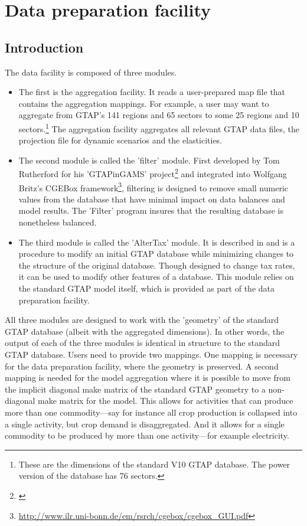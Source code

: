\section{Data preparation facility}

\subsection{Introduction}

The data facility is composed of three modules.

\begin{itemize}
   \item The first is the aggregation facility. It reads a user-prepared map
         file that contains the aggregation mappings. For example, a user may
         want to aggregate from GTAP's 141 regions and 65 sectors to some 25
         regions and 10 sectors.\footnote{These are the dimensions of the standard
         V10 GTAP database. The power version of the database has 76 sectors.}
         The aggregation facility aggregates all relevant GTAP data files,
         the projection file for dynamic scenarios and the elasticities.
   \item The second module is called the 'filter' module. First developed by Tom
         Rutherford for his 'GTAPinGAMS'
         project\footnote{\cite{LanzRutherfordJGEA2016}} and integrated into
         Wolfgang Britz's CGEBox framework\footnote{
         \url{http://www.ilr.uni-bonn.de/em/rsrch/cgebox/cgebox_GUI.pdf}},
         filtering is designed to remove small numeric values from the database
         that have minimal impact on data balances and model results. The
         'Filter' program insures that the resulting database is nonetheless
         balanced.
   \item The third module is called the 'AlterTax' module. It is described in
         \cite{MalcolmGTAPTP12} and is a procedure to modify an initial GTAP
         database while minimizing changes to the structure of the original
         database. Though designed to change tax rates, it can be used to modify
         other features of a database. This module relies on the standard GTAP
         model itself, which is provided as part of the data preparation
         facility.
\end{itemize}

All three modules are designed to work with the 'geometry' of the standard GTAP
database (albeit with the aggregated dimensions). In other words, the output of
each of the three modules is identical in structure to the standard GTAP
database. Users need to provide two mappings. One mapping is necessary for the
data preparation facility, where the geometry is preserved. A second mapping is
needed for the model aggregation where it is possible to move from the implicit
diagonal make matrix of the standard GTAP geometry to a non-diagonal make matrix
for the model. This allows for activities that can produce more than one
commodity---say for instance all crop production is collapsed into a single
activity, but crop demand is disaggregated. And it allows for a single commodity
to be produced by more than one activity---for example electricity.

